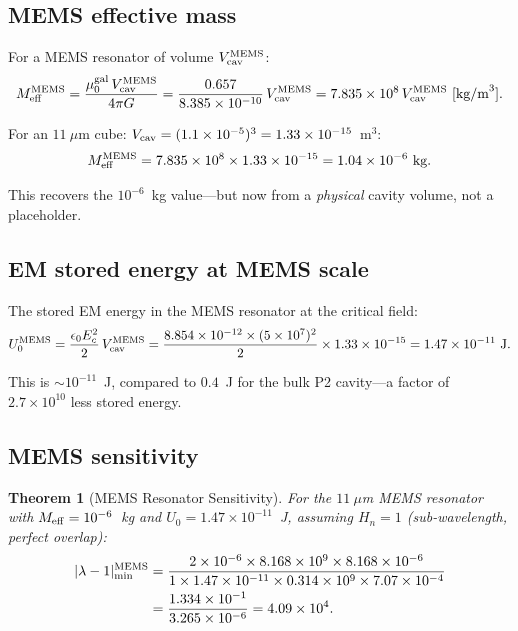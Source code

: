 \documentclass[11pt,twocolumn]{article}
\newcommand{\lam}{\lambda}
\newcommand{\Meff}{M_{\rm eff}}
\newcommand{\ee}[1]{\times 10^{#1}}
\newcommand{\Heff}{H_n}
\newcommand{\Vcav}{V_{\rm cav}}
\newcommand{\muG}{\mu_0^{\rm gal}}
\newtheorem{theorem}{Theorem}[section]
\theoremstyle{definition}
\theoremstyle{remark}
\begin{document}
\subsection{MEMS effective mass}
\label{sec:mems_mass}

For a MEMS resonator of volume $\Vcav^{\rm MEMS}$:
\begin{equation}
\Meff^{\rm MEMS} = \frac{\muG\,\Vcav^{\rm MEMS}}{4\pi G}
= \frac{0.657}{8.385\ee{-10}}\,\Vcav^{\rm MEMS}
= 7.835\ee{8}\,\Vcav^{\rm MEMS}~[\text{kg/m}^3].
\label{eq:Meff_MEMS}
\end{equation}

For an $11~\mu$m cube: $\Vcav = (1.1\ee{-5})^3 = 1.33\ee{-15}$~m$^3$:
\begin{equation}
\Meff^{\rm MEMS} = 7.835\ee{8}\times 1.33\ee{-15} = 1.04\ee{-6}~\text{kg}.
\label{eq:Meff_MEMS_num}
\end{equation}

This recovers the $10^{-6}$~kg value---but now from a \emph{physical}
cavity volume, not a placeholder.

\subsection{EM stored energy at MEMS scale}
\label{sec:mems_energy}

The stored EM energy in the MEMS resonator at the critical field:
\begin{equation}
U_0^{\rm MEMS} = \frac{\epsilon_0 E_c^2}{2}\,\Vcav^{\rm MEMS}
= \frac{8.854\ee{-12}\times(5\ee{7})^2}{2}\times 1.33\ee{-15}
= 1.47\ee{-11}~\text{J}.
\label{eq:U_MEMS}
\end{equation}

This is $\sim 10^{-11}$~J, compared to $0.4$~J for the bulk P2 cavity---a
factor of $2.7\ee{10}$ less stored energy.

\subsection{MEMS sensitivity}
\label{sec:mems_sensitivity}

\begin{theorem}[MEMS Resonator Sensitivity]
\label{thm:mems}
For the $11~\mu$m MEMS resonator with $\Meff = 10^{-6}$~kg and
$U_0 = 1.47\ee{-11}$~J, assuming $\Heff = 1$ (sub-wavelength, perfect overlap):
\begin{align}
|\lam-1|_{\rm min}^{\rm MEMS}
&= \frac{2\times 10^{-6}\times 8.168\ee{9}\times 8.168\times 10^{-6}}
{1\times 1.47\ee{-11}\times 0.314\times 10^9\times 7.07\ee{-4}}
\nonumber\\
&= \frac{1.334\ee{-1}}{3.265\ee{-6}}
= 4.09\ee{4}.
\label{eq:MEMS_result}
\end{align}
\end{theorem}
\end{document}
